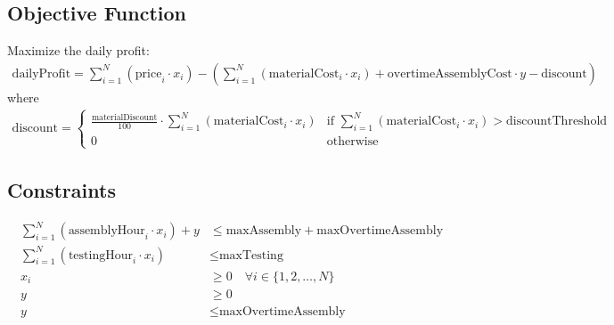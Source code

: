 \documentclass{article}
\begin{document}
\subsection*{Objective Function}
Maximize the daily profit:
\begin{align*}
\text{dailyProfit} = \sum_{i=1}^{N} (\text{price}_i \cdot x_i) - \left( \sum_{i=1}^{N} (\text{materialCost}_i \cdot x_i) + \text{overtimeAssemblyCost} \cdot y - \text{discount} \right)
\end{align*}
where
\begin{align*}
\text{discount} =
\begin{cases}
\frac{\text{materialDiscount}}{100} \cdot \sum_{i=1}^{N} (\text{materialCost}_i \cdot x_i) & \text{if } \sum_{i=1}^{N} (\text{materialCost}_i \cdot x_i) > \text{discountThreshold} \\
0 & \text{otherwise}
\end{cases}
\end{align*}

\subsection*{Constraints}
\begin{align*}
\sum_{i=1}^{N} (\text{assemblyHour}_i \cdot x_i) + y & \leq \text{maxAssembly} + \text{maxOvertimeAssembly} \\
\sum_{i=1}^{N} (\text{testingHour}_i \cdot x_i) & \leq \text{maxTesting} \\
x_i & \geq 0 \quad \forall i \in \{1, 2, \ldots, N\} \\
y & \geq 0 \\
y & \leq \text{maxOvertimeAssembly} \\
\end{align*}
\end{document}
